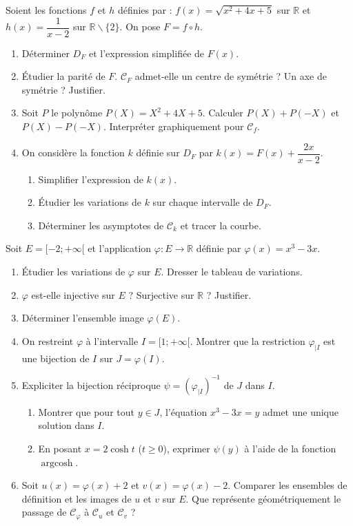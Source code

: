 \documentclass[11pt]{article}
\def\setminus{\mathbin{\backslash}}\let\smallsetminus\setminus
\begin{document}
\begin{exercice}
Soient les fonctions $f$ et $h$ définies par :
$f(x)=\sqrt{x^2+4x+5}$ sur $\mathbb{R}$ et $h(x)=\dfrac{1}{x-2}$ sur $\mathbb{R}\setminus\{2\}$.
On pose $F = f \circ h$.
\begin{enumerate}
    \item Déterminer $D_F$ et l'expression simplifiée de $F(x)$.
    \item Étudier la parité de $F$. $\mathcal{C}_F$ admet-elle un centre de symétrie ? Un axe de symétrie ? Justifier.
    \item Soit $P$ le polynôme $P(X)=X^2+4X+5$. Calculer $P(X)+P(-X)$ et $P(X)-P(-X)$. Interpréter graphiquement pour $\mathcal{C}_f$.
    \item On considère la fonction $k$ définie sur $D_F$ par $k(x)=F(x)+\dfrac{2x}{x-2}$.
    \begin{enumerate}
        \item Simplifier l'expression de $k(x)$.
        \item Étudier les variations de $k$ sur chaque intervalle de $D_F$.
        \item Déterminer les asymptotes de $\mathcal{C}_k$ et tracer la courbe.
    \end{enumerate}
\end{enumerate}
\end{exercice}

\begin{exercice}
Soit $E=[-2; +\infty[$ et l'application $\varphi : E \to \mathbb{R}$ définie par $\varphi(x)=x^3-3x$.
\begin{enumerate}
    \item Étudier les variations de $\varphi$ sur $E$. Dresser le tableau de variations.
    \item $\varphi$ est-elle injective sur $E$ ? Surjective sur $\mathbb{R}$ ? Justifier.
    \item Déterminer l'ensemble image $\varphi(E)$.
    \item On restreint $\varphi$ à l'intervalle $I=[1; +\infty[$. Montrer que la restriction $\varphi_{|I}$ est une bijection de $I$ sur $J=\varphi(I)$.
    \item Expliciter la bijection réciproque $\psi = (\varphi_{|I})^{-1}$ de $J$ dans $I$.
    \begin{enumerate}
        \item Montrer que pour tout $y \in J$, l'équation $x^3-3x=y$ admet une unique solution dans $I$.
        \item En posant $x = 2\cosh t$ ($t \ge 0$), exprimer $\psi(y)$ à l'aide de la fonction $\operatorname{argcosh}$.
    \end{enumerate}
    \item Soit $u(x)=\varphi(x)+2$ et $v(x)=\varphi(x)-2$. Comparer les ensembles de définition et les images de $u$ et $v$ sur $E$. Que représente géométriquement le passage de $\mathcal{C}_\varphi$ à $\mathcal{C}_u$ et $\mathcal{C}_v$ ?
\end{enumerate}
\end{exercice}
\end{document}
